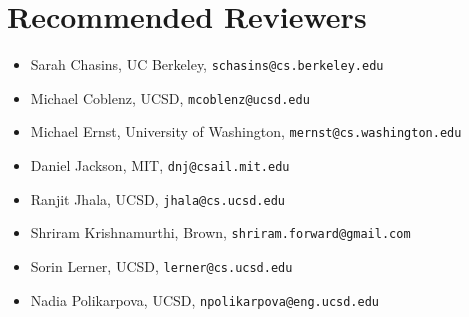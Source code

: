 \section*{Recommended Reviewers}

\begin{itemize}
  \item Sarah Chasins, UC Berkeley, \texttt{schasins@cs.berkeley.edu}
  \item Michael Coblenz, UCSD, \texttt{mcoblenz@ucsd.edu}
  \item Michael Ernst, University of Washington,
        \texttt{mernst@cs.washington.edu} 
  \item Daniel Jackson, MIT, \texttt{dnj@csail.mit.edu}
  \item Ranjit Jhala, UCSD, \texttt{jhala@cs.ucsd.edu}
  \item Shriram Krishnamurthi, Brown, \texttt{shriram.forward@gmail.com}
  \item Sorin Lerner, UCSD, \texttt{lerner@cs.ucsd.edu}
  \item Nadia Polikarpova, UCSD, \texttt{npolikarpova@eng.ucsd.edu}
\end{itemize}